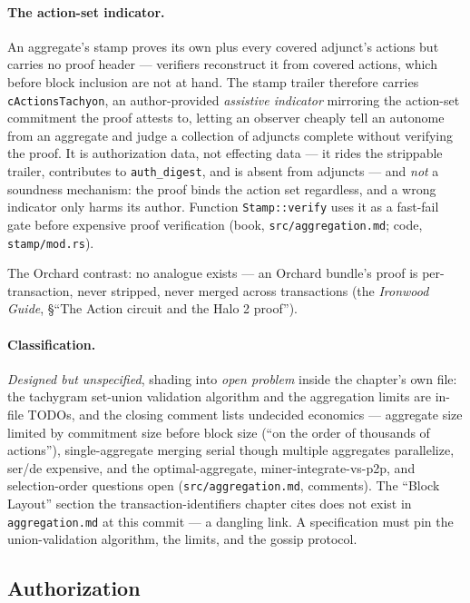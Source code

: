 \documentclass[11pt,a4paper]{article}
\theoremstyle{definition}
\begin{document}
\paragraph{The action-set indicator.} An aggregate's stamp proves its own
plus every covered adjunct's actions but carries no proof header ---
verifiers reconstruct it from covered actions, which before block
inclusion are not at hand. The stamp trailer therefore carries
\texttt{cActionsTachyon}, an author-provided \emph{assistive indicator}
mirroring the action-set commitment the proof attests to, letting an
observer cheaply tell an autonome from an aggregate and judge a collection
of adjuncts complete without verifying the proof. It is authorization
data, not effecting data --- it rides the strippable trailer, contributes
to \texttt{auth\_digest}, and is absent from adjuncts --- and \emph{not} a
soundness mechanism: the proof binds the action set regardless, and a
wrong indicator only harms its author. Function \texttt{Stamp::verify}
uses it as a fast-fail gate before expensive proof verification (book,
\texttt{src/aggregation.md}; code, \texttt{stamp/mod.rs}).

The Orchard contrast: no analogue exists --- an Orchard bundle's proof is
per-transaction, never stripped, never merged across transactions (the
\emph{Ironwood Guide}, \S``The Action circuit and the Halo 2 proof'').

\paragraph{Classification.} \emph{Designed but unspecified}, shading into
\emph{open problem} inside the chapter's own file: the tachygram set-union
validation algorithm and the aggregation limits are in-file TODOs, and the
closing comment lists undecided economics --- aggregate size limited by
commitment size before block size (``on the order of thousands of
actions''), single-aggregate merging serial though multiple aggregates
parallelize, ser/de expensive, and the optimal-aggregate,
miner-integrate-vs-p2p, and selection-order questions open
(\texttt{src/aggregation.md}, comments). The ``Block Layout'' section the
transaction-identifiers chapter cites does not exist in
\texttt{aggregation.md} at this commit --- a dangling link. A
specification must pin the union-validation algorithm, the limits, and
the gossip protocol.

\subsection{Authorization}\label{sec:tachyon-design-auth}
\end{document}
